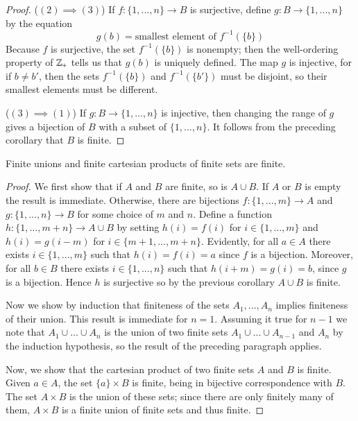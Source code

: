 \documentclass[12pt, a4paper, oneside, openright, titlepage]{book}
\begin{document}
\begin{appendices}
\begin{proof}
        ($(2)\implies (3)$) If $f:\{1,...,n\}\rightarrow B$ is surjective, define $g:B\rightarrow \{1,...,n\}$ by the equation \begin{equation*}
            g(b) = \text{smallest element of } f^{-1}(\{b\})
        \end{equation*}
        Because $f$ is surjective, the set $f^{-1}(\{b\})$ is nonempty; then the well-ordering property of $\mathbb Z_+$ tells us that $g(b)$ is uniquely defined. The map $g$ is injective, for if $b \neq b'$, then the sets $f^{-1}(\{b\})$ and $f^{-1}(\{b'\})$ must be disjoint, so their smallest elements must be different.


        ($(3)\implies (1)$) If $g:B\rightarrow \{1,...,n\}$ is injective, then changing the range of $g$ gives a bijection of $B$ with a subset of $\{1,...,n\}$. It follows from the preceding corollary that $B$ is finite.
    \end{proof}


    \begin{corollary}
        Finite unions and finite cartesian products of finite sets are finite.
    \end{corollary}
    \begin{proof}
        We first show that if $A$ and $B$ are finite, so is $A\cup B$. If $A$ or $B$ is empty the result is immediate. Otherwise, there are bijections $f:\{1,...,m\}\rightarrow A$ and $g:\{1,...,n\}\rightarrow B$ for some choice of $m$ and $n$. Define a function $h:\{1,...,m+n\}\rightarrow A\cup B$ by setting $h(i) = f(i)$ for $i \in \{1,...,m\}$ and $h(i) = g(i-m)$ for $i \in \{m+1,...,m+n\}$. Evidently, for all $a \in A$ there exists $i \in \{1,...,m\}$ such that $h(i) = f(i) = a$ since $f$ is a bijection. Moreover, for all $b \in B$ there exists $i \in \{1,...,n\}$ such that $h(i+m) = g(i) = b$, since $g$ is a bijection. Hence $h$ is surjective so by the previous corollary $A\cup B$ is finite.

        Now we show by induction that finiteness of the sets $A_1,...,A_n$ implies finiteness of their union. This result is immediate for $n=1$. Assuming it true for $n-1$ we note that $A_1\cup...\cup A_n$ is the union of two finite sets $A_1\cup ... \cup A_{n-1}$ and $A_n$ by the induction hypothesis, so the result of the preceding paragraph applies.

        Now, we show that the cartesian product of two finite sets $A$ and $B$ is finite. Given $a \in A$, the set $\{a\}\times B$ is finite, being in bijective correspondence with $B$. The set $A \times B$ is the union of these sets; since there are only finitely many of them, $A\times B$ is a finite union of finite sets and thus finite.


\end{proof}
\end{appendices}
\end{document}
